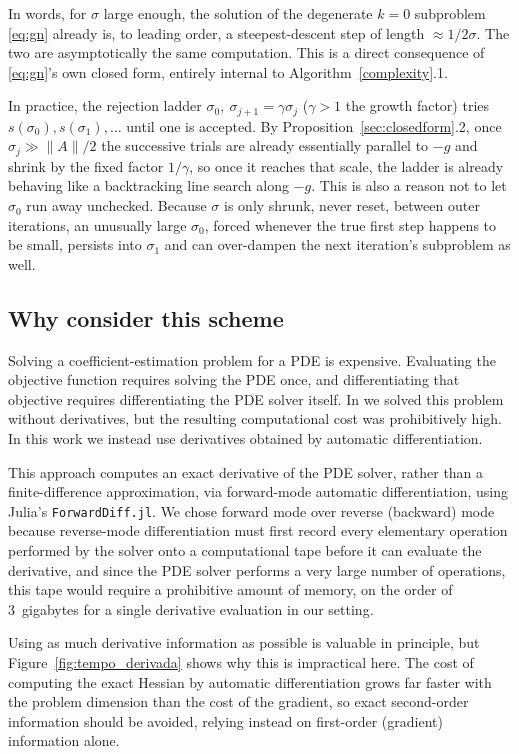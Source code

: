 \documentclass{article}
\newcommand{\norm}[1]{\|#1\|}
\begin{document}
In words, for $\sigma$ large enough, the solution of the degenerate
$k=0$ subproblem \eqref{eq:gn} already is, to leading order, a
steepest-descent step of length $\approx1/2\sigma$. The two are
asymptotically the same computation. This is a direct consequence of
\eqref{eq:gn}'s own closed form, entirely internal to Algorithm~\ref{complexity}.1.

In practice, the rejection ladder $\sigma_0,\ \sigma_{j+1}=\gamma\sigma_j$
($\gamma>1$ the growth factor) tries $s(\sigma_0), s(\sigma_1),\dots$
until one is accepted. By Proposition~\ref{sec:closedform}.2, once $\sigma_j\gg\norm{A}/2$ the
successive trials are already essentially parallel to $-g$ and shrink by
the fixed factor $1/\gamma$, so once it reaches that scale, the ladder
is already behaving like a backtracking line search along $-g$. This is
also a reason not to let $\sigma_0$ run away unchecked. Because $\sigma$ is
only shrunk, never reset, between outer iterations, an unusually large
$\sigma_0$, forced whenever the true first step happens to be small,
persists into $\sigma_1$ and can over-dampen the next iteration's
subproblem as well.




\subsection{Why consider this scheme}

Solving a coefficient-estimation problem for a PDE is expensive.
Evaluating the objective function requires solving the PDE once, and
differentiating that objective requires differentiating the PDE solver
itself. In \cite{FortunatoMartinez2025} we solved this problem without
derivatives, but the resulting computational cost was prohibitively high.
In this work we instead use derivatives obtained by automatic
differentiation.

This approach computes an exact derivative of the PDE solver, rather than
a finite-difference approximation, via forward-mode automatic
differentiation, using Julia's \texttt{ForwardDiff.jl}. We chose forward
mode over reverse (backward) mode because reverse-mode differentiation
must first record every elementary operation performed by the solver onto
a computational tape before it can evaluate the derivative, and since the
PDE solver performs a very large number of operations, this tape would
require a prohibitive amount of memory, on the order of 3~gigabytes for a
single derivative evaluation in our setting.

Using as much derivative information as possible is valuable in
principle, but Figure~\ref{fig:tempo_derivada} shows why this is
impractical here. The cost of computing the exact Hessian by automatic
differentiation grows far faster with the problem dimension than the cost
of the gradient, so exact second-order information should be avoided,
relying instead on first-order (gradient) information alone.
\end{document}

